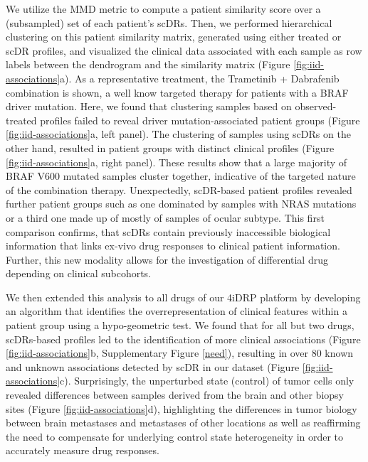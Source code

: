 We utilize the MMD metric to compute a patient similarity score over a (subsampled) set of each patient's scDRs.
Then, we performed hierarchical clustering on this patient similarity matrix, generated using either treated or scDR profiles,
and visualized the clinical data associated with each sample as row labels between the dendrogram and the similarity matrix (Figure \ref{fig:iid-associations}a).
As a representative treatment, the Trametinib + Dabrafenib combination is shown, a well know targeted therapy for patients with a BRAF driver mutation.
Here, we found that clustering samples based on observed-treated profiles failed to reveal driver mutation-associated patient groups (Figure \ref{fig:iid-associations}a, left panel).
The clustering of samples using scDRs on the other hand, resulted in patient groups with distinct clinical profiles (Figure \ref{fig:iid-associations}a, right panel).
These results show that a large majority of BRAF V600 mutated samples cluster together, indicative of the targeted nature of the combination therapy.
 Unexpectedly, scDR-based patient profiles revealed further patient groups such as one dominated by samples with NRAS mutations or a third one made up of mostly of samples of ocular subtype.
 This first comparison confirms, that scDRs contain previously inaccessible biological information that links ex-vivo drug responses to clinical patient information.
 Further, this new modality allows for the investigation of differential drug depending on clinical subcohorts. 

We then extended this analysis to all drugs of our 4iDRP platform by developing an algorithm that identifies the overrepresentation of clinical features within a patient group using a hypo-geometric test.
 We found that for all but two drugs, scDRs-based profiles led to the identification of more clinical associations (Figure \ref{fig:iid-associations}b, Supplementary Figure \ref{need}),
 resulting in over 80 known and unknown associations detected by scDR in our dataset (Figure \ref{fig:iid-associations}c).
 Surprisingly, the unperturbed state (control) of tumor cells only revealed differences between samples derived from the brain and other biopsy sites (Figure \ref{fig:iid-associations}d),
 highlighting the differences in tumor biology between brain metastases and metastases of other locations \cite{eichler2011}
 as well as reaffirming the need to compensate for underlying control state heterogeneity in order to accurately measure drug responses.

